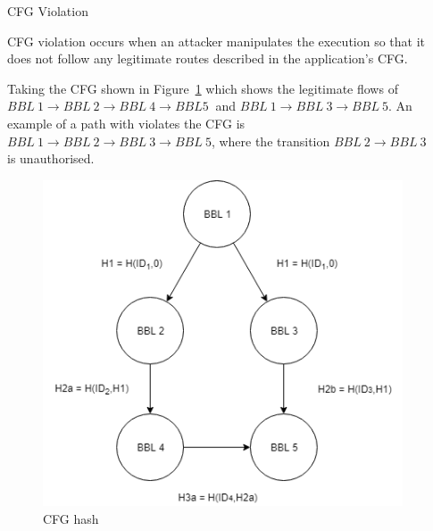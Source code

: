 \documentclass[final]{beamer}
\newlength{\sepwid}
\newlength{\onecolwid}
\newlength{\twocolwid}
\begin{document}
\begin{frame}[t]
\begin{columns}[t]
\begin{column}{\sepwid}\end{column} %

\begin{column}{\twocolwid} %


\begin{columns}[t,totalwidth=\twocolwid] %

\begin{column}{\onecolwid}\vspace{-.6in} %

\begin{block}{CFG Violation}

CFG violation occurs when an attacker manipulates the execution so that it does not follow any legitimate routes described in the application's CFG.

Taking the CFG shown in Figure~\ref{fig:CFGhash} which shows the legitimate flows of $ BBL~1 \rightarrow BBL~2 \rightarrow BBL~4 \rightarrow BBL 5~$ and $ BBL~1 \rightarrow BBL~3 \rightarrow BBL~5$. An example of a path with violates the CFG is $ BBL~1 \rightarrow BBL~2 \rightarrow BBL~3\rightarrow BBL~5$, where the transition $BBL~2 \rightarrow BBL~3$ is unauthorised.

\end{block}

\begin{figure}
\includegraphics[width=\linewidth]{images/CFGhash.png}
\caption{CFG hash}
\label{fig:CFGhash}
\vspace{-1cm}
\end{figure}


\end{column}
\end{columns}
\end{column}
\end{columns}
\end{frame}
\end{document}
